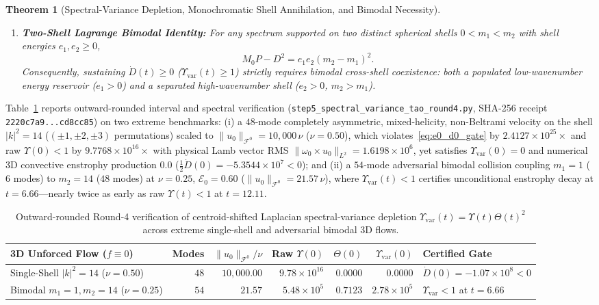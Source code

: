 \documentclass[11pt]{article}
\theoremstyle{plain}
\newtheorem{theorem}{Theorem}[section]
\theoremstyle{definition}
\begin{document}
\begin{theorem}[Spectral-Variance Depletion, Monochromatic Shell Annihilation, and Bimodal Necessity]
\begin{enumerate}
  \item \textbf{Two-Shell Lagrange Bimodal Identity:} For any spectrum supported on two distinct spherical shells $0 < m_1 < m_2$ with shell energies $e_1, e_2 \ge 0$,
  \begin{equation}\label{eq:lagrange_bimodal}
    M_0 P - D^2 = e_1 e_2 (m_2 - m_1)^2.
  \end{equation}
  Consequently, sustaining $\dot{D}(t) \ge 0$ ($\Upsilon_{\mathrm{var}}(t) \ge 1$) strictly requires \emph{bimodal cross-shell coexistence}: both a populated low-wavenumber energy reservoir ($e_1 > 0$) and a separated high-wavenumber shell ($e_2 > 0$, $m_2 > m_1$).
\end{enumerate}
\end{theorem}

Table~\ref{tab:step5} reports outward-rounded interval and spectral verification (\texttt{step5\_spectral\_\allowbreak variance\_tao\_round4.py}, SHA-256 receipt \texttt{2220c7a9...cd8cc85}) on two extreme benchmarks: (i) a $48$-mode completely asymmetric, mixed-helicity, non-Beltrami velocity on the shell $|k|^2 = 14$ ($(\pm 1, \pm 2, \pm 3)$ permutations) scaled to $\|u_0\|_{\mathcal{F}^0} = 10{,}000\,\nu$ ($\nu = 0.50$), which violates~\eqref{eq:e0_d0_gate} by $2.4127 \times 10^{25}\times$ and raw $\Upsilon(0) < 1$ by $9.7768 \times 10^{16}\times$ with physical Lamb vector RMS $\|\omega_0 \times u_0\|_{L^2} = 1.6198 \times 10^6$, yet satisfies $\Upsilon_{\mathrm{var}}(0) = 0$ and numerical 3D convective enstrophy production $0.0$ ($\frac{1}{2}\dot{D}(0) = -5.3544 \times 10^7 < 0$); and (ii) a $54$-mode adversarial bimodal collision coupling $m_1 = 1$ ($6$ modes) to $m_2 = 14$ ($48$ modes) at $\nu = 0.25$, $\mathcal{E}_0 = 0.60$ ($\|u_0\|_{\mathcal{F}^0} = 21.57\,\nu$), where $\Upsilon_{\mathrm{var}}(t) < 1$ certifies unconditional enstrophy decay at $t = 6.66$---nearly twice as early as raw $\Upsilon(t) < 1$ at $t = 12.11$.

\begin{table}[htbp]
\centering
\caption{Outward-rounded Round-4 verification of centroid-shifted Laplacian spectral-variance depletion $\Upsilon_{\mathrm{var}}(t) = \Upsilon(t)\Theta(t)^2$ across extreme single-shell and adversarial bimodal 3D flows.}
\label{tab:step5}
\vspace{4pt}
{\small\setlength{\tabcolsep}{4.5pt}
\begin{tabular}{@{}lrrrrrl@{}}
\toprule
3D Unforced Flow ($f \equiv 0$) & Modes & $\|u_0\|_{\mathcal{F}^0}/\nu$ & Raw $\Upsilon(0)$ & $\Theta(0)$ & $\Upsilon_{\mathrm{var}}(0)$ & Certified Gate \\
\midrule
Single-Shell $|k|^2 = 14$ ($\nu = 0.50$) & $48$ & $10{,}000.00$ & $9.78 \times 10^{16}$ & $0.0000$ & $0.0000$ & $\dot{D}(0) = -1.07 \times 10^8 < 0$ \\
Bimodal $m_1 = 1, m_2 = 14$ ($\nu = 0.25$) & $54$ & $21.57$ & $5.48 \times 10^5$ & $0.7123$ & $2.78 \times 10^5$ & $\Upsilon_{\mathrm{var}} < 1$ at $t = 6.66$ \\
\bottomrule
\end{tabular}}
\end{table}
\end{document}
